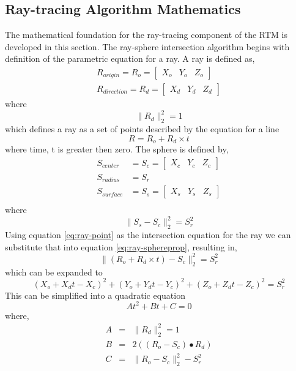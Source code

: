 \subsection{Ray-tracing Algorithm Mathematics}
The mathematical foundation for the ray-tracing component of the RTM is developed in this section. The ray-sphere intersection algorithm begins with definition of the parametric equation for a ray. A ray is defined as,
\begin{equation}
\begin{split}
R_{origin} = R_o = \left[ \begin{matrix} X_o&Y_o&Z_o \end{matrix}\right]\\
R_{direction} = R_d = \left[ \begin{matrix} X_d&Y_d&Z_d \end{matrix}\right]
\end{split}
\end{equation}
where
\begin{equation}
\|R_d\|_2^2 = 1
\end{equation}
which defines a ray as a set of points described by the equation for a line
\begin{equation}\label{eq:ray-point}
R = R_o + R_d \times t
\end{equation}
where time, t is greater then zero. The sphere is defined by,
\begin{equation}
\begin{split}
S_{center} &= S_c = \left[ \begin{matrix} X_c&Y_c&Z_c \end{matrix}\right]\\
S_{radius} &= S_r \\
S_{surface} &= S_s = \left[ \begin{matrix} X_s&Y_s&Z_s \end{matrix}\right]\\
\end{split}
\end{equation}
where
\begin{equation} \label{eq:ray-sphereprop}
\| S_s - S_c \|_2^2 = S_r^2
\end{equation}
Using equation \ref{eq:ray-point} as the intersection equation for the ray we can substitute that into equation \ref{eq:ray-sphereprop}, resulting in,
\begin{equation}
\| (R_o +R_d \times t) - S_c \|_2^2 = S_r^2
\end{equation}
which can be expanded to
\begin{equation}
(X_o +X_dt - X_c)^2 + (Y_o +Y_dt - Y_c)^2 + (Z_o +Z_dt - Z_c)^2 = S_r^2
\end{equation}
This can be simplified into a quadratic equation
\begin{equation}
At^2 + Bt+C =0
\end{equation}
where,
\begin{eqnarray}
A &=& \|R_d\|_2^2 = 1\\
B &=& 2 \left( \left( R_o -S_c \right) \bullet R_d \right)\\
C &=& \| R_o - S_c \|_2^2 - S_r^2
\end{eqnarray}

